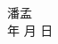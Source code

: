 \documentclass[cn,11pt,chinese]{elegantbook}
\renewcommand{\today}{\number\year 年 \number\month 月 \number\day 日}
\begin{document}
\begin{flushright}
潘孟\\
\today
\end{flushright}

%
%
%
%
%
%
%
\end{document}
